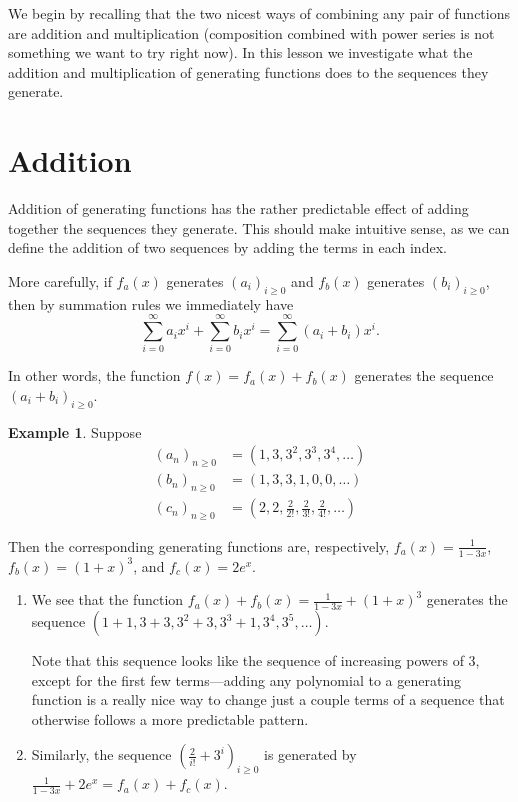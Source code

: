 \documentclass{article}
\theoremstyle{definition}
\newtheorem{example}{Example}
\begin{document}
We begin by recalling that the two nicest ways of combining any pair of functions are addition and multiplication (composition combined with power series is not something we want to try right now). In this lesson we investigate what the addition and multiplication of generating functions does to the sequences they generate.

\section*{Addition}
Addition of generating functions has the rather predictable effect of adding together the sequences they generate. This should make intuitive sense, as we can define the addition of two sequences by adding the terms in each index.

More carefully, if $f_{a}(x)$ generates $\left(a_{i}\right)_{i \geq 0}$ and $f_{b}(x)$ generates $\left(b_{i}\right)_{i \geq 0}$, then by summation rules we immediately have
\[\sum_{i=0}^{\infty} a_{i} x^{i}+\sum_{i=0}^{\infty} b_{i} x^{i}=\sum_{i=0}^{\infty}\left(a_{i}+b_{i}\right) x^{i}.\]

In other words, the function $f(x)=f_{a}(x)+f_{b}(x)$ generates the sequence $\left(a_{i}+b_{i}\right)_{i \geq 0}$.

\begin{example}
Suppose
\begin{align}
\left(a_{n}\right)_{n \geq 0} &= \left(1,3,3^{2}, 3^{3}, 3^{4}, \ldots\right) \\
\left(b_{n}\right)_{n \geq 0} &= (1,3,3,1,0,0, \ldots) \\
\left(c_{n}\right)_{n \geq 0} &= \left(2,2, \frac{2}{2!}, \frac{2}{3!}, \frac{2}{4!}, \ldots\right)
\end{align}

Then the corresponding generating functions are, respectively, $f_{a}(x)=\frac{1}{1-3 x}$, $f_{b}(x)=(1+x)^{3}$, and $f_{c}(x)=2 e^{x}$.

\begin{enumerate}[label=(\alph*)]
\item We see that the function $f_{a}(x)+f_{b}(x)=\frac{1}{1-3 x}+(1+x)^{3}$ generates the sequence $\left(1+1,3+3,3^{2}+3,3^{3}+1,3^{4}, 3^{5}, \ldots\right)$.

Note that this sequence looks like the sequence of increasing powers of 3, except for the first few terms---adding any polynomial to a generating function is a really nice way to change just a couple terms of a sequence that otherwise follows a more predictable pattern.

\item Similarly, the sequence $\left(\frac{2}{i!}+3^{i}\right)_{i \geq 0}$ is generated by $\frac{1}{1-3 x}+2 e^{x}=f_{a}(x)+f_{c}(x)$.
\end{enumerate}
\end{example}
\end{document}
